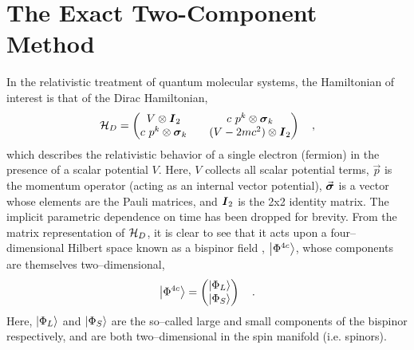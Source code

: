 \section{The Exact Two-Component Method}
\label{sec:X2C}

In the relativistic treatment of quantum molecular systems, the Hamiltonian
of interest is that of the Dirac Hamiltonian\cite{Dyall07_book,Reiher15_book},
\begin{equation}
\mathcal{H}_D = 
\begin{pmatrix}
  V \otimes \boldsymbol{I}_2 && c \text { } p^k \otimes \boldsymbol{\sigma}_k \\
  c \text { } p^k \otimes \boldsymbol{\sigma}_k && (V - 2mc^2) \otimes \boldsymbol{I}_2
\end{pmatrix} \quad ,
\label{eq:DiracHam}
\end{equation}
which describes the relativistic behavior of a single electron (fermion) in the
presence of a scalar potential $V$. Here, $V$ collects all scalar potential
terms, $\vec{p}$ is the momentum operator (acting as an internal vector
potential), $\vec{\boldsymbol{\sigma}}$ is a vector whose elements are the Pauli
matrices, and $\boldsymbol{I}_2$ is the 2x2 identity matrix. The implicit parametric
dependence on time has been dropped for brevity. 
From the matrix representation of $\mathcal{H}_D$, it is clear to see that it
acts upon a four--dimensional Hilbert space known as a bispinor field ,
$\left\vert \Phi^{4c} \right\rangle$, whose components are themselves two--dimensional,
\begin{equation}
\left\vert \Phi^{4c} \right\rangle = \begin{pmatrix}
 \left\vert \Phi_L \right\rangle \\ \left\vert \Phi_S \right\rangle
\end{pmatrix} \quad.
\end{equation}
Here, $\left\vert \Phi_L \right\rangle$ and $\left\vert \Phi_S \right\rangle$ are the so--called large and small
components of the bispinor respectively, and are both two--dimensional in the
spin manifold (i.e. spinors).

